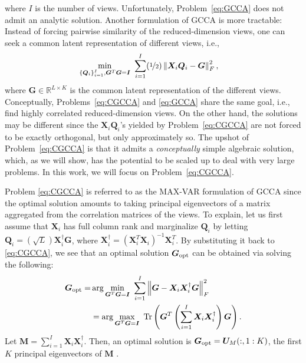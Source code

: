 \documentclass[10pt,journal]{IEEEtran}
\newcommand{\reminder}[1]{ \color{blue} [[[ \marginpar{\mbox{\color{blue} ${\bf <==}$ \color{black}}} #1 ]]] \color{black}}
\begin{document}
where $I$ is the number of views.
Unfortunately, Problem~\eqref{eq:GCCA} does not admit an analytic solution.
Another formulation of GCCA is more tractable: Instead of forcing pairwise similarity of the reduced-dimension views,
one can seek a common latent representation of different views, i.e., \cite{carroll1968generalization,rastogimultiview,arora2014multi,van2006generalized,kettenring1971canonical}
\begin{equation}\label{eq:CGCCA}
\begin{aligned}
\min_{\{{\bm Q}_i\}_{i=1}^I,{\bm G}^T{\bm G}={\bm I}} &~\sum_{i=1}^{I}(\nicefrac{1}{2})\left\|{\bm X}_i{\bm Q}_i-{\bm G}\right\|_F^2,
\end{aligned}
\end{equation}
where ${\bm G}\in\mathbb{R}^{L\times K}$ is the common latent representation of the different views.
Conceptually, Problems~\eqref{eq:CGCCA} and \eqref{eq:GCCA} share the same goal, i.e., find highly correlated reduced-dimension views. On the other hand, the solutions may be different since the ${\bm X}_i {\bm Q}_i$'s yielded by Problem~\eqref{eq:CGCCA} are not forced to be exactly orthogonal, but only approximately so.
The upshot of Problem~\eqref{eq:CGCCA} is that it admits a {\em conceptually} simple algebraic solution, which, as we will show, has the potential to be scaled up to deal with very large problems. %
In this work, we will focus on Problem~\eqref{eq:CGCCA}.

Problem \eqref{eq:CGCCA} is referred to as the MAX-VAR formulation of GCCA since the optimal solution amounts to taking principal eigenvectors of a matrix aggregated from the correlation matrices of the views.
To explain, let us first assume that ${\bm X}_i$ has full column rank
and marginalize ${\bm Q}_i$ by letting
${\bm Q}_i=(\sqrt{L}){\bm X}_i^\dag{\bm G}$, where ${\bm X}_i^\dag=({\bm X}_i^T{\bm X}_i)^{-1}{\bm X}_i^T$. By substituting it back to \eqref{eq:CGCCA}, we see that an optimal solution ${\bm G}_{\rm opt}$ can be obtained via solving the following:
\begin{equation}
\begin{aligned}
{\bm G}_{\rm opt}=&\arg\min_{{\bm G}^T{\bm G}={\bm I}}~\sum_{i=1}^I\left\| {\bm G} - {\bm X}_i{\bm X}_i^\dag{\bm G} \right\|_F^2\\
& = \arg\max_{{\bm G}^T{\bm G} = {\bm I}} ~ {\rm Tr}\left({\bm G}^T\left(\sum_{i=1}^I {\bm X}_i{\bm X}_i^\dag\right){\bm G}\right). \label{eq:new_obj}
\end{aligned}
\end{equation}
Let ${\bm M} = \sum_{i=1}^I {\bm X}_i{\bm X}_i^\dag$.
Then, an optimal solution is ${\bm G}_{\rm opt}={\bm U}_M(:,1:K)$, 
the first $K$ principal eigenvectors of ${\bm M}$ \cite{GHGolub1996}.
\end{document}
